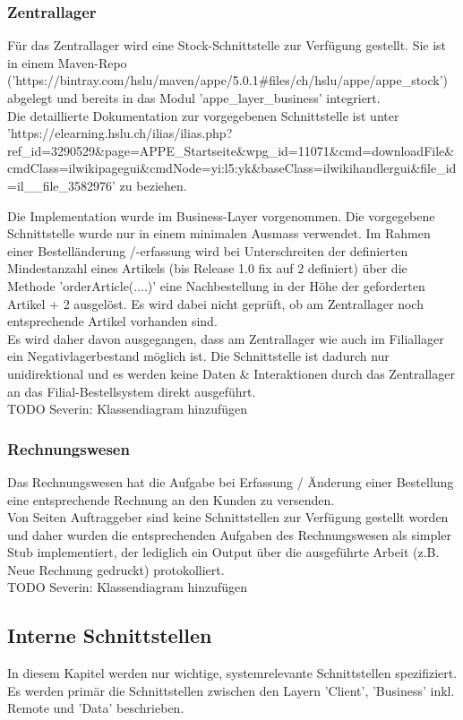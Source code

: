\subsubsection{Zentrallager}
Für das Zentrallager wird eine Stock-Schnittstelle zur Verfügung gestellt. Sie ist in einem Maven-Repo ('https://bintray.com/hslu/maven/appe/5.0.1\#files/ch/hslu/appe/appe\_stock') abgelegt und bereits in das Modul 'appe\_layer\_business' integriert.\\
Die detaillierte Dokumentation zur vorgegebenen Schnittstelle ist unter\\
'https://elearning.hslu.ch/ilias/ilias.php?ref\_id=3290529\&page=APPE\_Startseite\&wpg\_id=11071\&cmd=downloadFile\&cmdClass=ilwikipagegui\&cmdNode=yi:l5:yk\&baseClass=ilwikihandlergui\&file\_id=il\_\_file\_3582976' zu beziehen.

Die Implementation wurde im Business-Layer vorgenommen. Die vorgegebene Schnittstelle wurde nur in einem minimalen Ausmass verwendet. Im Rahmen einer Bestelländerung /-erfassung wird bei Unterschreiten der definierten Mindestanzahl eines Artikels (bis Release 1.0 fix auf 2 definiert) über die Methode 'orderArticle(....)' eine Nachbestellung in der Höhe der geforderten Artikel + 2 ausgelöst. Es wird dabei nicht geprüft, ob am Zentrallager noch entsprechende Artikel vorhanden sind. \\Es wird daher davon ausgegangen, dass am Zentrallager wie auch im Filiallager ein Negativlagerbestand möglich ist. Die Schnittstelle ist dadurch nur unidirektional und es werden keine Daten \& Interaktionen durch das Zentrallager an das Filial-Bestellsystem direkt ausgeführt.  \\
TODO Severin: Klassendiagram hinzufügen
\subsubsection{Rechnungswesen}
Das Rechnungswesen hat die Aufgabe bei Erfassung / Änderung einer Bestellung eine entsprechende Rechnung an den Kunden zu versenden.\\
Von Seiten Auftraggeber sind keine Schnittstellen zur Verfügung gestellt worden und daher wurden die entsprechenden Aufgaben des Rechnungswesen als simpler Stub implementiert, der lediglich ein Output über die ausgeführte Arbeit (z.B. Neue Rechnung gedruckt) protokolliert. \\
TODO Severin: Klassendiagram hinzufügen

\subsection{Interne Schnittstellen}
In diesem Kapitel werden nur wichtige, systemrelevante Schnittstellen spezifiziert. Es werden primär die Schnittstellen zwischen den Layern 'Client', 'Business' inkl. Remote und 'Data' beschrieben.

